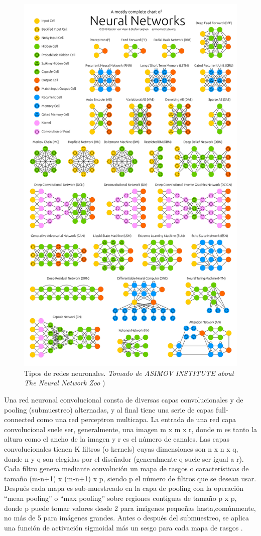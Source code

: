 \begin{figure}[H]
    \centering
    \includegraphics[width=0.7\linewidth]{imagenes/NeuralNetworkZoo20042019-1400x2380.png}
    \caption{Tipos de redes neuronales. \textit{Tomado de ASIMOV INSTITUTE about The Neural Network Zoo}
    \label{fig:my_Label})}
\end{figure}


Una red neuronal convolucional consta de diversas capas convolucionales y de pooling (submuestreo) alternadas, y al final tiene una serie de capas full-connected como una red perceptron multicapa. La entrada de una red capa convolucional suele ser, generalmente, una imagen m	x	m	x	r, donde m es tanto la altura como el ancho de la imagen y r es el número de canales. Las capas convolucionales tienen K filtros (o
kernels) cuyas dimensiones son 	n x n x q, donde n y q son elegidas por el diseñador (generalmente q suele ser igual a r). Cada filtro genera mediante convolución un mapa de rasgos o características de tamaño (m-n+1) x (m-n+1) x p, siendo p el número de filtros que se desean usar. Después cada mapa es sub-muestreado en la capa de pooling con la operación “mean pooling” o “max pooling” sobre regiones contiguas de tamaño p x p, donde p puede tomar valores desde 2 para imágenes pequeñas hasta,comúnmente, no más de 5 para imágenes grandes. Antes o después del submuestreo, se aplica una función de activación sigmoidal más un sesgo para cada mapa de rasgos \cite{duran2017redes}.

